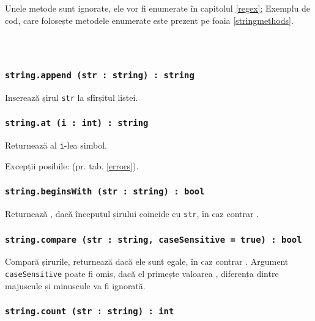 Unele metode sunt ignorate, ele vor fi enumerate în capitolul \ref{regex}; Exemplu de cod, care folosește metodele enumerate este prezent pe foaia \ref{stringmethods}.

\

\begin{sourcecode}
    \label{stringmethods}
    \inputminted[linenos]{icl}{../sources/stringmethods.icL}
\end{sourcecode}

\subsubsection{\texttt{string.append (str : string) : string}}

Inserează șirul \texttt{str} la sfîrșitul listei.

\subsubsection{\texttt{string.at (i : int) : string}}

Returnează al \texttt{i}-lea simbol.

Excepții posibile:  (pr. tab. \ref{errors}).

\subsubsection{\texttt{string.beginsWith (str : string) : bool}}

Returnează \true{}, dacă începutul șirului coincide cu \texttt{str}, în caz contrar \false{}.

\subsubsection{\texttt{string.compare (str : string, caseSensitive = true) : bool}}

Compară șirurile, returnează \true{} dacă ele sunt egale, în caz contrar \false{}. Argument \texttt{caseSensitive} poate fi omis, dacă el primește valoarea \false{}, diferența dintre majuscule și minuscule va fi ignorată.

\subsubsection{\texttt{string.count (str : string) : int}}

